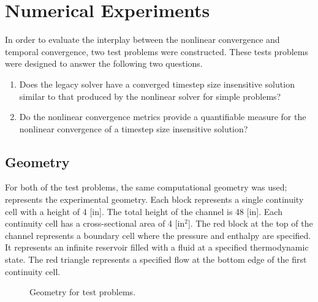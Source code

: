 \section{Numerical Experiments}
\label{sect:numerical_experiments}

In order to evaluate the interplay between the nonlinear convergence and temporal convergence, two test problems were constructed.
These tests problems were designed to answer the following two questions.

\begin{enumerate}
\item{Does the legacy solver have a converged timestep size insensitive solution similar to that produced by the nonlinear solver for simple problems?}
\item{Do the nonlinear convergence metrics provide a quantifiable measure for the nonlinear convergence of a timestep size insensitive solution?}
\end{enumerate}

\subsection{Geometry}
\label{subsect:experimental_geometry}
For both of the test problems, the same computational geometry was used;   represents the experimental geometry.
Each block represents a single continuity cell with a height of 4 [in].
The total height of the channel is 48 [in].
Each continuity cell has a cross-sectional area of 4 [in$^2$].
The red block at the top of the channel represents a boundary cell where the pressure and enthalpy are specified.
It represents an infinite reservoir filled with a fluid at a specified thermodynamic state.
The red triangle represents a specified flow at the bottom edge of the first continuity cell. 

\begin{figure}[h!t]
\begin{center}
\end{center}
\caption{Geometry for test problems.}
\label{fig:exp_geometry}
\end{figure}

